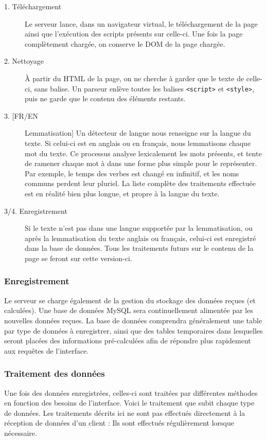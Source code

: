 				\begin{description}
					\item[1. Téléchargement] Le serveur lance, dans un navigateur virtual, le téléchargement de la page ainsi que l'exécution des scripts présents sur celle-ci. Une fois la page complètement chargée, on conserve le DOM de la page chargée.
					\item[2. Nettoyage] À partir du HTML de la page, on ne cherche à garder que le texte de celle-ci, sans balise. Un parseur enlève toutes les balises \texttt{<script>} et \texttt{<style>}, puis ne garde que le contenu des éléments restants.
					\item[3. [FR/EN] Lemmatisation] Un détecteur de langue nous renseigne sur la langue du texte. Si celui-ci est en anglais ou en français, nous lemmatisons chaque mot du texte. Ce processus analyse lexicalement les mots présents, et tente de ramener chaque mot à dans une forme plus simple pour le représenter. Par exemple, le temps des verbes est changé en infinitif, et les noms communs perdent leur pluriel. La liste complète des traitements effectuée est en réalité bien plus longue, et propre à la langue du texte.
					\item[3/4. Enregistrement] Si le texte n'est pas dans une langue supportée par la lemmatisation, ou après la lemmatisation du texte anglais ou français, celui-ci est enregistré dans la base de données. Tous les traitements futurs sur le contenu de la page se feront sur cette version-ci.
				\end{description}

		\subsubsection{Enregistrement}

			Le serveur se charge également de la gestion du stockage des données reçues (et calculées). Une base de données MySQL sera continuellement alimentée par les nouvelles données reçues. La base de données comprendra généralement une table par type de données à enregistrer, ainsi que des tables temporaires dans lesquelles seront placées des informations pré-calculées afin de répondre plus rapidement aux requêtes de l'interface.

		\subsubsection{Traitement des données}

			Une fois des données enregistrées, celles-ci sont traitées par différentes méthodes en fonction des besoins de l'interface. Voici le traitement que subit chaque type de données. Les traitements décrits ici ne sont pas effectués directement à la réception de données d'un client : Ils sont effectués régulièrement lorsque nécessaire.


